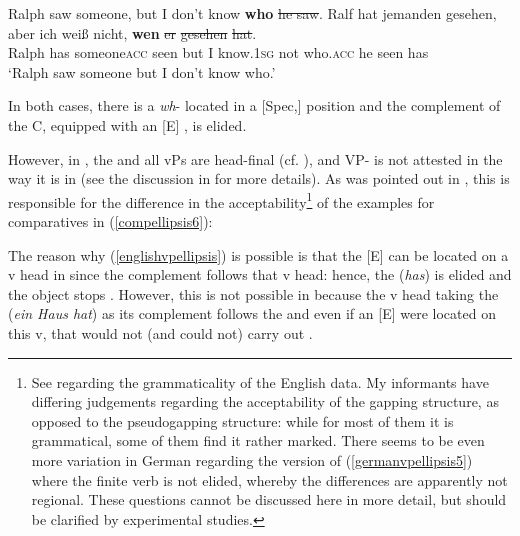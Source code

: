 \ea \label{englishgermancompare6}
\ea	Ralph saw someone, but I don't know \textbf{who} \sout{he saw}.
\ex	\gll Ralf	hat	jemanden	gesehen,	aber	ich	weiß nicht,	\textbf{wen} \sout{er} \sout{gesehen} \sout{hat}.\\
Ralph	has	someone\textsc{acc}	seen	but	I	know.\textsc{1sg} not who.\textsc{acc} he seen has\\
\glt `Ralph saw someone but I don’t know who.'
\z
\z

In both cases, there is a \textit{wh}- located in a [Spec,] position and the complement of the C, equipped with an [E] , is elided.

\largerpage[2]
However, in , the  and all vPs are head-final (cf. \citealt[34]{haider1985}), and VP- is not attested in the way it is in  (see the discussion in  for more details). As was pointed out in , this is responsible for the difference in the acceptability\footnote{See \citealt{kennedymerchant2000} regarding the grammaticality of the English data. My informants have differing judgements regarding the acceptability of the gapping structure, as opposed to the pseudogapping structure: while for most of them it is grammatical, some of them find it rather marked. There seems to be even more variation in German regarding the version of (\ref{germanvpellipsis5}) where the finite verb is not elided, whereby the differences are apparently not regional. These questions cannot be discussed here in more detail, but should be clarified by experimental studies.} of the examples for comparatives in (\ref{compellipsis6}):

\ea \label{compellipsis6}
 \label{englishvpellipsis}
\z
\z

The reason why (\ref{englishvpellipsis}) is possible is that the [E]  can be located on a v head in  since the complement follows that v head: hence, the  (\textit{has}) is elided and the object  stops . However, this is not possible in  because the v head taking the  (\textit{ein Haus hat}) as its complement follows the  and even if an [E]  were located on this v, that would not (and could not) carry out .

